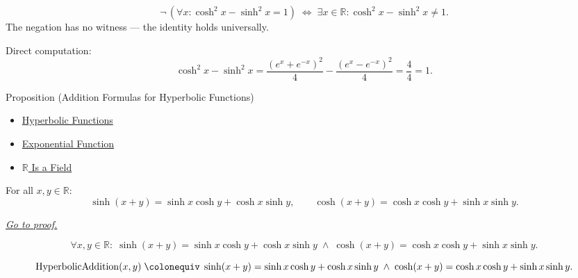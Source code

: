 \begin{remark*}
\[
  \neg\,(\forall x:\cosh^2 x - \sinh^2 x=1)
  \;\iff\;
  \exists x\in\mathbb{R}:\cosh^2 x - \sinh^2 x\neq 1.
\]
The negation has no witness --- the identity holds universally.
\end{remark*}

\begin{remark*}[Proof]
Direct computation:
\[
  \cosh^2 x - \sinh^2 x
  = \frac{(e^x+e^{-x})^2}{4} - \frac{(e^x-e^{-x})^2}{4}
  = \frac{4}{4} = 1.
\]
\end{remark*}


\begin{propositionbox}{Proposition (Addition Formulas for Hyperbolic Functions)}

\begin{dependencies}
\begin{itemize}
  \item \hyperref[def:hyperbolic]{Hyperbolic Functions}
  \item \hyperref[def:exponential]{Exponential Function}
  \item \hyperref[thm:r-is-a-field]{$\mathbb{R}$ Is a Field}
\end{itemize}
\end{dependencies}
\begin{proposition}
\label{prop:hyperbolic-addition}
For all $x, y \in \mathbb{R}$:
\[
  \sinh(x+y) = \sinh x \cosh y + \cosh x \sinh y,
  \qquad
  \cosh(x+y) = \cosh x \cosh y + \sinh x \sinh y.
\]

\smallskip\noindent
\hyperref[prf:hyperbolic-addition]{\textit{Go to proof.}}
\end{proposition}
\end{propositionbox}\begin{remark*}
\[
  \forall x,y\in\mathbb{R}:\;
  \sinh(x+y) = \sinh x\cosh y + \cosh x\sinh y
  \;\wedge\;
  \cosh(x+y) = \cosh x\cosh y + \sinh x\sinh y.
\]
\end{remark*}

\begin{remark*}
\[
  \operatorname{HyperbolicAddition}(x,y)
  \;\colonequiv\;
  \sinh(x+y) = \sinh x\cosh y + \cosh x\sinh y
  \;\wedge\;
  \cosh(x+y) = \cosh x\cosh y + \sinh x\sinh y.
\]
\end{remark*}


